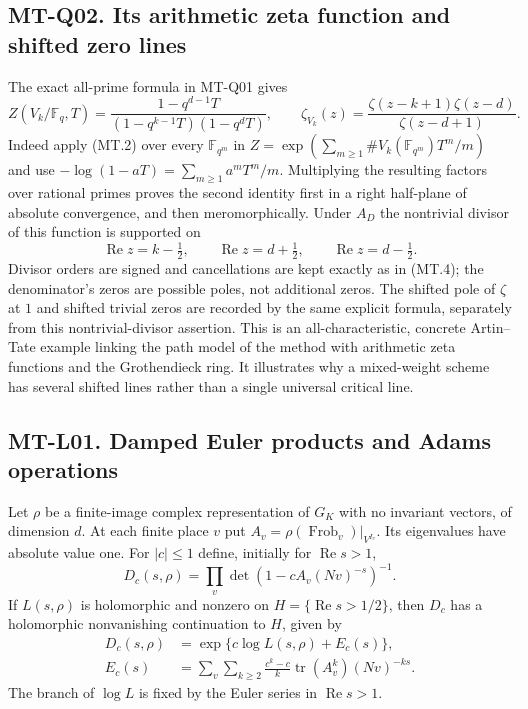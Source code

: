 \documentclass[11pt,a4paper]{article}
\begin{document}
\subsection*{MT-Q02. Its arithmetic zeta function and shifted zero lines}
The exact all-prime formula in MT-Q01 gives
\[
 Z(V_k/\mathbb F_q,T)
     =\frac{1-q^{d-1}T}{(1-q^{k-1}T)(1-q^dT)},
 \qquad
 \zeta_{V_k}(z)
     =\frac{\zeta(z-k+1)\zeta(z-d)}{\zeta(z-d+1)}.       \tag{MT.4}
\]
Indeed apply (MT.2) over every $\mathbb F_{q^m}$ in
$Z=\exp(\sum_{m\ge1}\#V_k(\mathbb F_{q^m})T^m/m)$ and use
$-\log(1-aT)=\sum_{m\ge1}a^mT^m/m$.  Multiplying the resulting factors
over rational primes proves the second identity first in a right
half-plane of absolute convergence, and then meromorphically.
Under $A_D$ the nontrivial divisor of this function is supported on
\[
    \operatorname{Re}z=k-\tfrac12,\qquad
    \operatorname{Re}z=d+\tfrac12,\qquad
    \operatorname{Re}z=d-\tfrac12.
\]
Divisor orders are signed and cancellations are kept exactly as in
(MT.4); the denominator's zeros are possible poles, not additional zeros.
The shifted pole of $\zeta$ at $1$ and shifted trivial zeros are recorded
by the same explicit formula, separately from this nontrivial-divisor
assertion.  This is an all-characteristic, concrete Artin--Tate example
linking the path model of the method with arithmetic zeta functions and
the Grothendieck ring.  It illustrates why a mixed-weight scheme has
several shifted lines rather than a single universal critical line.

\subsection*{MT-L01. Damped Euler products and Adams operations}
Let $\rho$ be a finite-image complex representation of $G_K$ with no
invariant vectors, of dimension $d$.  At each finite place $v$ put
$A_v=\rho(\operatorname{Frob}_v)|_{V^{I_v}}$.  Its eigenvalues have
absolute value one.  For $|c|\le1$ define, initially for $\operatorname{Re}s>1$,
\[
 D_c(s,\rho)=\prod_v\det(1-cA_v(Nv)^{-s})^{-1}.
\]
If $L(s,\rho)$ is holomorphic and nonzero on
$H=\{\operatorname{Re}s>1/2\}$, then $D_c$ has a holomorphic nonvanishing
continuation to $H$, given by
\begin{align*}
 D_c(s,\rho)&=\exp\{c\log L(s,\rho)+E_c(s)\},\\
 E_c(s)&=\sum_v\sum_{k\ge2}
   \frac{c^k-c}{k}\operatorname{tr}(A_v^k)(Nv)^{-ks}.
\end{align*}
The branch of $\log L$ is fixed by the Euler series in
$\operatorname{Re}s>1$.
\end{document}
